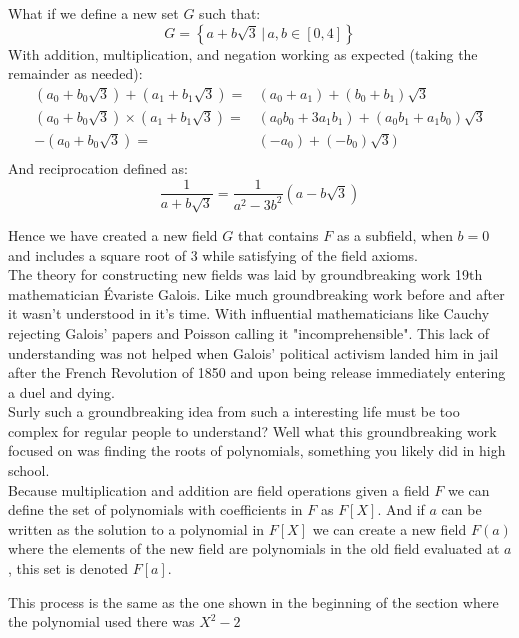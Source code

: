 What if we define a new set $G$ such that:
\[G = \left\{a+b\sqrt{3}\,|\,a,b\in [0,4]\right\}\]
With addition, multiplication, and negation working as expected (taking the remainder as needed):
\begin{equation*}
\begin{aligned}
	(a_0+b_0\sqrt{3})+(a_1+b_1\sqrt{3}) =& (a_0+a_1)+(b_0+b_1)\sqrt{3} \\
	(a_0+b_0\sqrt{3})\times (a_1+b_1\sqrt{3}) =& (a_0b_0+3a_1b_1)+(a_0b_1+a_1b_0)\sqrt{3} \\
	-(a_0+b_0\sqrt{3})=& (-a_0)+(-b_0)\sqrt{3})\\
\end{aligned}
\end{equation*}
And reciprocation defined as:
\[\frac{1}{a+b\sqrt{3}} = \frac{1}{a^2-3b^2}(a-b\sqrt{3})\]

Hence we have created a new field $G$ that contains $F$ as a subfield, when $b=0$ and includes a square root of $3$ while satisfying of the field axioms.
\\

\label{intro:galois}
The theory for constructing new fields was laid by groundbreaking work 19$\text{th}$ mathematician Évariste Galois.
Like much groundbreaking work before and after it wasn't understood in it's time.
With influential mathematicians like Cauchy rejecting Galois' papers and Poisson calling it "incomprehensible".
This lack of understanding was not helped when Galois' political activism landed him in jail after the French Revolution of 1850 and upon being release immediately entering a duel and dying.
\\

Surly such a groundbreaking idea from such a interesting life must be too complex for regular people to understand?
Well what this groundbreaking work focused on was finding the roots of polynomials,
something you likely did in high school.
\\

Because multiplication and addition are field operations given a field $F$ we can define the set of polynomials with coefficients in $F$ as $F[X]$.
And if $a$ can be written as the solution to a polynomial in $F[X]$ we can create a new field $F(a)$ where the elements of the new field are polynomials in the old field evaluated at $a$, this set is denoted \hyperref[appx:adjoining]{$F[a]$}.

This process is the same as the one shown in the beginning of the section where the polynomial used there was $X^2-2$
\\

